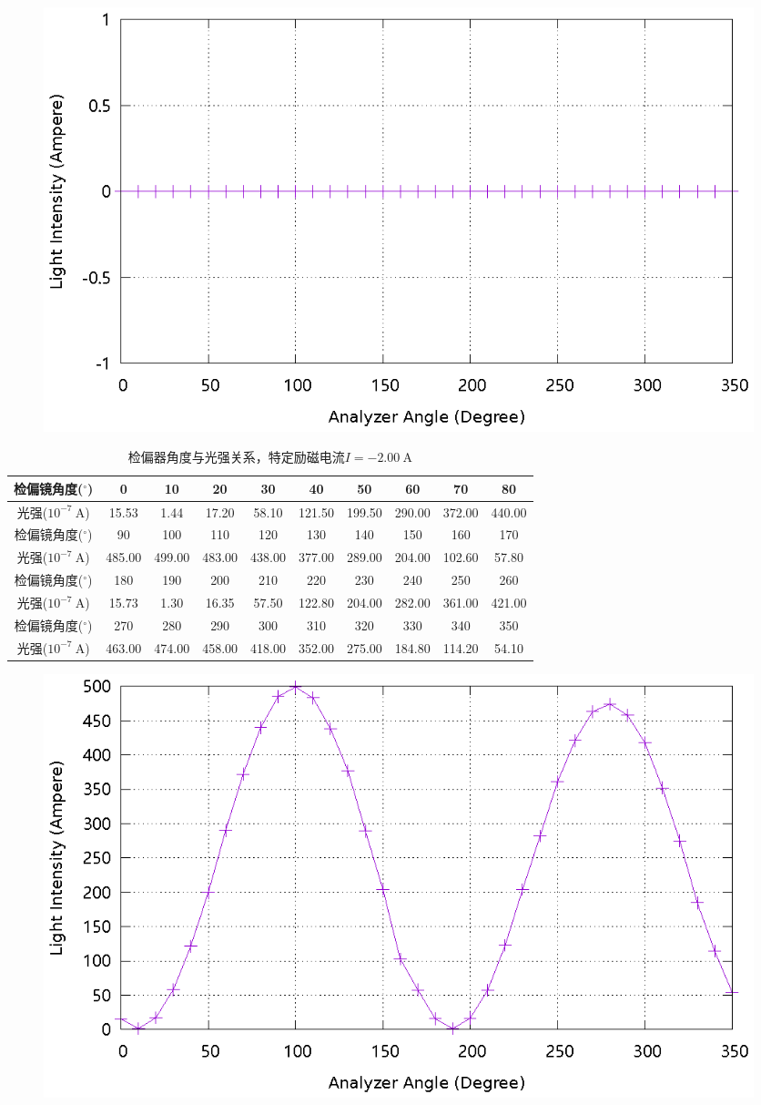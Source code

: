 \documentclass{ctexart}
\newcommand{\si}[1]{\  \mathrm{#1}}
\begin{document}
\begin{figure}[H]
    \centering
    \includegraphics[width=0.9\linewidth]{../output/analyzer-angle-light-intensity-1.gnuplot}
\end{figure}
\newpage
\begin{table}[H]
    \centering
    \begin{tabular}{|c|c|c|c|c|c|c|c|c|c|}
        \hline
        检偏镜角度(${}^{\circ}$)  & 0   & 10  & 20  & 30  & 40  & 50  & 60  & 70  & 80  \\\hline
        光强($10^{-7} \si{A}$) & 15.53 & 1.44 & 17.20 & 58.10 & 121.50 & 199.50 & 290.00 & 372.00 & 440.00 \\\hline
        检偏镜角度(${}^{\circ}$)  & 90  & 100 & 110 & 120 & 130 & 140 & 150 & 160 & 170 \\\hline
        光强($10^{-7} \si{A}$) & 485.00 & 499.00 & 483.00 & 438.00 & 377.00 & 289.00 & 204.00 & 102.60 & 57.80 \\\hline
        检偏镜角度(${}^{\circ}$)  & 180 & 190 & 200 & 210 & 220 & 230 & 240 & 250 & 260 \\\hline
        光强($10^{-7} \si{A}$) & 15.73 & 1.30 & 16.35 & 57.50 & 122.80 & 204.00 & 282.00 & 361.00 & 421.00 \\\hline
        检偏镜角度(${}^{\circ}$)  & 270 & 280 & 290 & 300 & 310 & 320 & 330 & 340 & 350 \\\hline
        光强($10^{-7} \si{A}$) & 463.00 & 474.00 & 458.00 & 418.00 & 352.00 & 275.00 & 184.80 & 114.20 & 54.10 \\\hline
    \end{tabular}
    \caption{检偏器角度与光强关系，特定励磁电流$I=-2.00 \si{A}$}
\end{table}
\begin{figure}[H]
    \centering
    \includegraphics[width=0.9\linewidth]{../output/analyzer-angle-light-intensity-2.gnuplot}
\end{figure}
\end{document}
